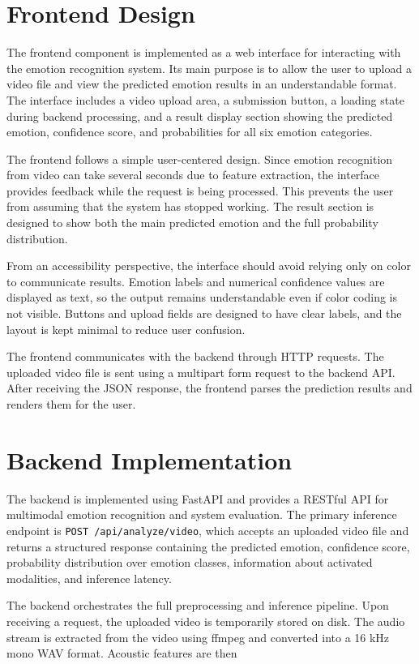 \section{Frontend Design}

The frontend component is implemented as a web interface for interacting with the emotion recognition system. Its main purpose is to allow the user to upload a video file and view the predicted emotion results in an understandable format. The interface includes a video upload area, a submission button, a loading state during backend processing, and a result display section showing the predicted emotion, confidence score, and probabilities for all six emotion categories.

The frontend follows a simple user-centered design. Since emotion recognition from video can take several seconds due to feature extraction, the interface provides feedback while the request is being processed. This prevents the user from assuming that the system has stopped working. The result section is designed to show both the main predicted emotion and the full probability distribution.

From an accessibility perspective, the interface should avoid relying only on color to communicate results. Emotion labels and numerical confidence values are displayed as text, so the output remains understandable even if color coding is not visible. Buttons and upload fields are designed to have clear labels, and the layout is kept minimal to reduce user confusion.

The frontend communicates with the backend through HTTP requests. The uploaded video file is sent using a multipart form request to the backend API. After receiving the JSON response, the frontend parses the prediction results and renders them for the user.

\section{Backend Implementation}

The backend is implemented using FastAPI and provides a RESTful API for multimodal emotion recognition and system evaluation. The primary inference endpoint is \texttt{POST /api/analyze/video}, which accepts an uploaded video file and returns a structured response containing the predicted emotion, confidence score, probability distribution over emotion classes, information about activated modalities, and inference latency.

The backend orchestrates the full preprocessing and inference pipeline. Upon receiving a request, the uploaded video is temporarily stored on disk. The audio stream is extracted from the video using ffmpeg and converted into a 16 kHz mono WAV format. Acoustic features are then


